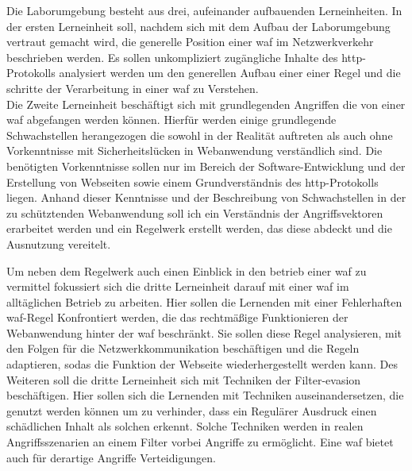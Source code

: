 Die Laborumgebung besteht aus drei, aufeinander aufbauenden Lerneinheiten.
In der ersten Lerneinheit soll, nachdem sich mit dem Aufbau der Laborumgebung vertraut gemacht wird, die generelle Position einer \ac{waf} im Netzwerkverkehr beschrieben werden.
Es sollen unkompliziert zugängliche Inhalte des \ac{http}-Protokolls analysiert werden um den generellen Aufbau einer einer Regel und die schritte der Verarbeitung in einer \ac{waf} zu Verstehen.\\

Die Zweite Lerneinheit beschäftigt sich mit grundlegenden Angriffen die von einer \ac{waf} abgefangen werden können.
Hierfür werden einige grundlegende Schwachstellen herangezogen die sowohl in der Realität auftreten als auch ohne Vorkenntnisse mit Sicherheitslücken in Webanwendung verständlich sind.
Die benötigten Vorkenntnisse sollen nur im Bereich der Software-Entwicklung und der Erstellung von Webseiten sowie einem Grundverständnis des \ac{http}-Protokolls liegen.
Anhand dieser Kenntnisse und der Beschreibung von Schwachstellen in der zu schütztenden Webanwendung soll ich ein Verständnis der Angriffsvektoren erarbeitet werden und ein Regelwerk erstellt werden, das diese abdeckt und die Ausnutzung vereitelt.

Um neben dem Regelwerk auch einen Einblick in den betrieb einer \ac{waf} zu vermittel fokussiert sich die dritte Lerneinheit darauf mit einer \ac{waf} im alltäglichen Betrieb zu arbeiten.
Hier sollen die Lernenden mit einer Fehlerhaften \ac{waf}-Regel Konfrontiert werden, die das rechtmäßige Funktionieren der Webanwendung  hinter der \ac{waf} beschränkt.
Sie sollen diese Regel analysieren, mit den Folgen für die Netzwerkkommunikation beschäftigen und die Regeln adaptieren, sodas die Funktion der Webseite wiederhergestellt werden kann.
Des Weiteren soll die dritte Lerneinheit sich mit Techniken der Filter-evasion beschäftigen.
Hier sollen sich die Lernenden mit Techniken auseinandersetzen, die genutzt werden können um zu verhinder, dass ein Regulärer Ausdruck einen schädlichen Inhalt als solchen erkennt.
Solche Techniken werden in realen Angriffsszenarien an einem Filter vorbei Angriffe zu ermöglicht.
Eine \ac{waf} bietet auch für derartige Angriffe Verteidigungen.